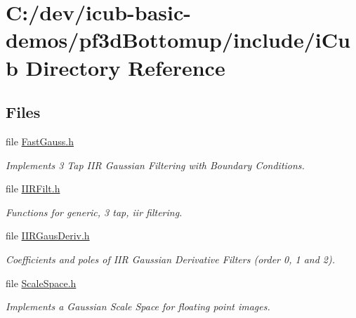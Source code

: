 \section{C\+:/dev/icub-\/basic-\/demos/pf3d\+Bottomup/include/i\+Cub Directory Reference}
\label{dir_eb22669ebb55c4a1830d5f6f631ad207}
\subsection*{Files}
\begin{DoxyCompactItemize}
\item 
file \hyperlink{FastGauss_8h}{Fast\+Gauss.\+h}
\begin{DoxyCompactList}\small\item\em Implements 3 Tap I\+IR Gaussian Filtering with Boundary Conditions. \end{DoxyCompactList}\item 
file \hyperlink{IIRFilt_8h}{I\+I\+R\+Filt.\+h}
\begin{DoxyCompactList}\small\item\em Functions for generic, 3 tap, iir filtering. \end{DoxyCompactList}\item 
file \hyperlink{IIRGausDeriv_8h}{I\+I\+R\+Gaus\+Deriv.\+h}
\begin{DoxyCompactList}\small\item\em Coefficients and poles of I\+IR Gaussian Derivative Filters (order 0, 1 and 2). \end{DoxyCompactList}\item 
file \hyperlink{ScaleSpace_8h}{Scale\+Space.\+h}
\begin{DoxyCompactList}\small\item\em Implements a Gaussian Scale Space for floating point images. \end{DoxyCompactList}\end{DoxyCompactItemize}
